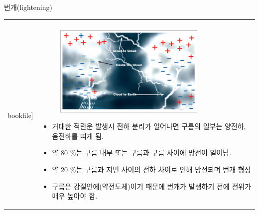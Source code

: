 \begin{frame}[t]{번개(lightening)}
	\begin{tabular}{ll}
		\begin{minipage}[t]{0.4\textwidth}\scriptsize
			\begin{figure}[t]
				\texttt{[image: \\bookfile]}
			\end{figure}
		\end{minipage}	
		&
		\begin{minipage}[t]{0.55\textwidth} \scriptsize	
			\begin{figure}[t]
				\includegraphics[width=0.8\textwidth]{./images/cheatsheet_24221.png}
			\end{figure}

			\begin{itemize}
				\item 거대한 적란운 발생시 전하 분리가 일어나면 구름의 일부는 양전하, 음전하를 띠게 됨.
				\item 약 80 \%는 구름 내부 또는 구름과 구름 사이에 방전이 일어남. 
				\item 약 20 \%는 구름과 지면 사이의 전하 차이로 인해 방전되며 번개 형성
				\item 구름은 강절연에(약전도체)이기 때문에 번개가 발생하기 전에 전위가 매우 높아야 함.
			\end{itemize}

		\end{minipage}
	\end{tabular}
\end{frame}




